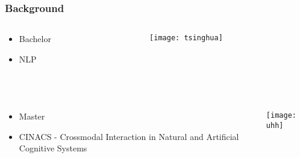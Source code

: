 \documentclass{beamer}
\title{\trtitle}
\author{\trauthor}
\date{\trdate}
\begin{document}
\frame{\titlepage}

\begin{frame}
  \frametitle{Background}

  \begin{columns}
    \begin{column}{.7\linewidth}
      \begin{itemize}
        \item Bachelor 
        \item NLP
      \end{itemize}
    \end{column}

    \begin{column}{.2\linewidth}
      \texttt{[image: tsinghua]}
    \end{column}
  \end{columns}

  ~

  \begin{columns}
    \begin{column}{.6\linewidth}
      \begin{itemize}
        \item Master
        \item CINACS - Crossmodal Interaction in Natural and Artificial Cognitive Systems
      \end{itemize}
    \end{column}

    \begin{column}{.3\linewidth}
      \texttt{[image: uhh]}
    \end{column}
  \end{columns}
\end{frame}

\end{document}

